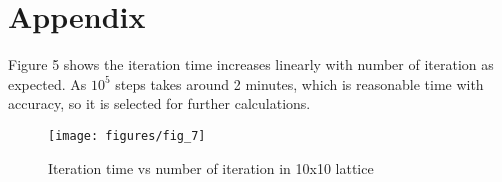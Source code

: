 \documentclass[]{article}
\begin{document}
\section*{Appendix}
Figure 5 shows the iteration time increases linearly with number of iteration as expected. As $10^5$ steps takes around 2 minutes, which is reasonable time with accuracy, so it is selected for further calculations.
\begin{figure}[p]
  \centering
  \texttt{[image: figures/fig\_7]}%
  \caption{\label{fig:epsart} Iteration time vs number of iteration in 10x10 lattice}
\end{figure}
\end{document}
